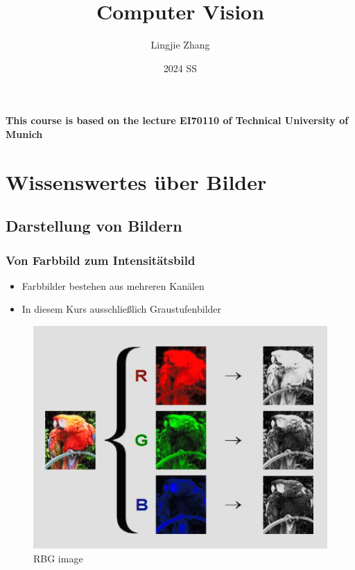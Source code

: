 \documentclass[12pt, a4paper, oneside]{article}
\title{Computer Vision}
\author{Lingjie Zhang}
\date{2024 SS}
\begin{document}
\maketitle

\centering
\textbf{This course is based on the lecture EI70110 of Technical University of Munich}

\raggedright

\tableofcontents
{}
\newpage
{}


\section{Wissenswertes über Bilder}

\subsection{Darstellung von Bildern}
\subsubsection*{Von Farbbild zum Intensitätsbild}
\begin{itemize}
    \item Farbbilder bestehen aus mehreren Kanälen
    \item In diesem Kurs ausschließlich Graustufenbilder
\end{itemize}

\begin{figure}[htbp]
    \centering
    \includegraphics[scale=0.8]{../img/1-1.png}
    \caption{RBG image}
    \label{img/1-1}
\end{figure}
\end{document}
